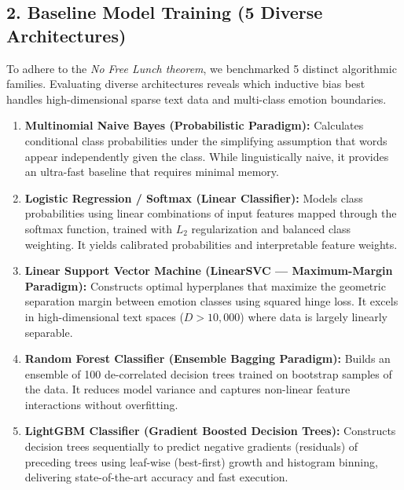\documentclass[11pt, a4paper]{article}
\begin{document}
\newpage
\subsection*{2. Baseline Model Training (5 Diverse Architectures)}
To adhere to the \textit{No Free Lunch theorem}, we benchmarked 5 distinct algorithmic families. Evaluating diverse architectures reveals which inductive bias best handles high-dimensional sparse text data and multi-class emotion boundaries.

\begin{enumerate}[leftmargin=1.5em]
    \item \textbf{Multinomial Naive Bayes (Probabilistic Paradigm):}
    Calculates conditional class probabilities under the simplifying assumption that words appear independently given the class. While linguistically naive, it provides an ultra-fast baseline that requires minimal memory.
    
    \item \textbf{Logistic Regression / Softmax (Linear Classifier):}
    Models class probabilities using linear combinations of input features mapped through the softmax function, trained with $L_2$ regularization and balanced class weighting. It yields calibrated probabilities and interpretable feature weights.

    \item \textbf{Linear Support Vector Machine (LinearSVC --- Maximum-Margin Paradigm):}
    Constructs optimal hyperplanes that maximize the geometric separation margin between emotion classes using squared hinge loss. It excels in high-dimensional text spaces ($D > 10,000$) where data is largely linearly separable.

    \item \textbf{Random Forest Classifier (Ensemble Bagging Paradigm):}
    Builds an ensemble of 100 de-correlated decision trees trained on bootstrap samples of the data. It reduces model variance and captures non-linear feature interactions without overfitting.

    \item \textbf{LightGBM Classifier (Gradient Boosted Decision Trees):}
    Constructs decision trees sequentially to predict negative gradients (residuals) of preceding trees using leaf-wise (best-first) growth and histogram binning, delivering state-of-the-art accuracy and fast execution.
\end{enumerate}
\end{document}

